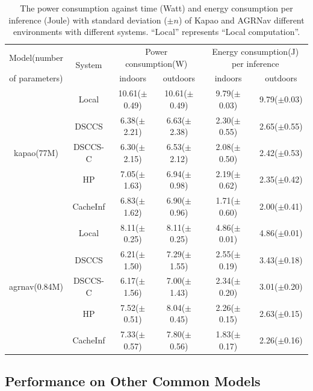 \begin{table}[htb]
\centering
\begin{tabular}{cc|c|c|c|c}
\toprule
 Model(number & \multirow[c]{2}{*}{System} & \multicolumn{2}{|c|}{Power consumption(W)} & \multicolumn{2}{|c}{Energy consumption(J) per inference} \\
 of parameters)&  & indoors & outdoors & indoors & outdoors \\
\midrule
\midrule
\multirow[c]{5}{*}{kapao(77M)} & Local & 10.61($\pm$0.49) & 10.61($\pm$0.49) & 9.79($\pm$0.03) & 9.79($\pm$0.03) \\
 & DSCCS & 6.38($\pm$2.21) & 6.63($\pm$2.38) & 2.30($\pm$0.55) & 2.65($\pm$0.55) \\
 & DSCCS-C & 6.30($\pm$2.15) & 6.53($\pm$2.12) & 2.08($\pm$0.50) & 2.42($\pm$0.53) \\
 & HP & 7.05($\pm$1.63) & 6.94($\pm$0.98) & 2.19($\pm$0.62) & 2.35($\pm$0.42) \\
 & CacheInf & 6.83($\pm$1.62) & 6.90($\pm$0.96) & 1.71($\pm$0.60) & 2.00($\pm$0.41) \\
\cline{1-6}
\multirow[c]{5}{*}{agrnav(0.84M)} & Local & 8.11($\pm$0.25) & 8.11($\pm$0.25) & 4.86($\pm$0.01) & 4.86($\pm$0.01) \\
 & DSCCS & 6.21($\pm$1.50) & 7.29($\pm$1.55) & 2.55($\pm$0.19) & 3.43($\pm$0.18) \\
 & DSCCS-C & 6.17($\pm$1.56) & 7.00($\pm$1.43) & 2.34($\pm$0.20) & 3.01($\pm$0.20) \\
 & HP & 7.52($\pm$0.51) & 8.04($\pm$0.45) & 2.26($\pm$0.15) & 2.63($\pm$0.15) \\
 & CacheInf & 7.33($\pm$0.57) & 7.80($\pm$0.56) & 1.83($\pm$0.17) & 2.26($\pm$0.16) \\
\cline{1-6}
\bottomrule
\end{tabular}

    \caption{The power consumption against time (Watt) and energy consumption per inference (Joule) with standard deviation ($\pm n$) of Kapao and AGRNav different environments with different systems. ``Local'' represents ``Local computation''.}
    \label{tab:e2e_power}
\end{table}

\subsection{Performance on Other Common Models}

